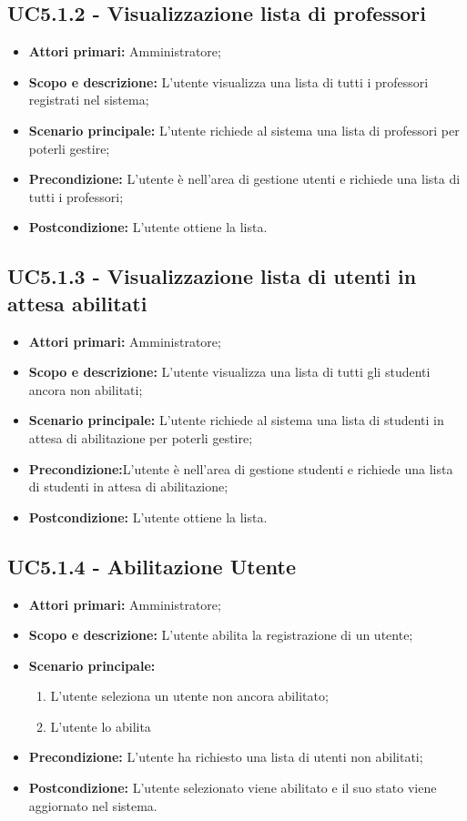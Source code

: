 \documentclass[AnalisiDeiRequisiti.tex]{subfiles}
\begin{document}
\subsection{UC5.1.2 - Visualizzazione lista di professori}
\begin{itemize}
	\item \textbf{Attori primari:} Amministratore;
	\item \textbf{Scopo e descrizione:} L'utente visualizza una lista di tutti i professori registrati nel sistema;
	\item \textbf{Scenario principale:} L'utente richiede al sistema una lista di professori per poterli gestire;
	\item \textbf{Precondizione:} L'utente è nell'area di gestione utenti e richiede una lista di tutti i professori; 
	\item \textbf{Postcondizione:} L'utente ottiene la lista.
\end{itemize}
\subsection{UC5.1.3 - Visualizzazione lista di utenti in attesa abilitati}
\begin{itemize}
	\item \textbf{Attori primari:} Amministratore;
	\item \textbf{Scopo e descrizione:} L'utente visualizza una lista di tutti gli studenti ancora non abilitati;
	\item \textbf{Scenario principale:} L'utente richiede al sistema una lista di studenti in attesa di abilitazione per poterli gestire;
	\item \textbf{Precondizione:}L'utente è nell'area di gestione studenti e richiede una lista di studenti in attesa di abilitazione; 
	\item \textbf{Postcondizione:} L'utente ottiene la lista.
\end{itemize}
\subsection{UC5.1.4 - Abilitazione Utente}
\begin{itemize}
	\item \textbf{Attori primari:} Amministratore;
	\item \textbf{Scopo e descrizione:} L'utente abilita la registrazione di un utente;
	\item \textbf{Scenario principale:}
	\begin{enumerate}
		\item L'utente seleziona un utente non ancora abilitato;
		\item L'utente lo abilita
	\end{enumerate}
	\item \textbf{Precondizione:} L'utente ha richiesto una lista di utenti non abilitati; 
	\item \textbf{Postcondizione:} L'utente selezionato viene abilitato e il suo stato viene aggiornato nel sistema.
\end{itemize}
\end{document}
